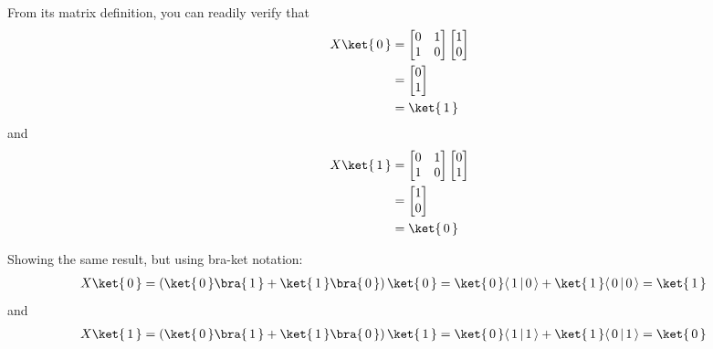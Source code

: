 \documentclass{article}
\theoremstyle{definition}
\newcommand{\kz}[1]{\ket{\,#1\,}}
\newcommand{\bz}[1]{\bra{\,#1\,}}
\begin{document}
From its matrix definition, you can readily verify that
\begin{align}
	X \kz0 &= \begin{bmatrix}
		0 & 1\\
		1 & 0
	\end{bmatrix} \begin{bmatrix}
		1\\
		0
	\end{bmatrix}\\
	&= \begin{bmatrix}
		0\\
		1
	\end{bmatrix}\\
	&= \kz1
\end{align}
and
\begin{align}
	X \kz1 &= \begin{bmatrix}
		0 & 1\\
		1 & 0
	\end{bmatrix} \begin{bmatrix}
		0\\
		1
	\end{bmatrix}\\
	&= \begin{bmatrix}
		1\\
		0
	\end{bmatrix}\\
	&= \kz0
\end{align}

Showing the same result, but using bra-ket notation:
\begin{align}
	X \kz0 &= \left(\kz{0}\bz{1} + \kz{1}\bz{0}\right) \kz0 = \kz{0} \langle \,1\,|\,0\,\rangle + \kz{1} \langle \,0\,|\,0\,\rangle = \kz{1}
\end{align}
and
\begin{align}
	X \kz1 &= \left(\kz{0}\bz{1} + \kz{1}\bz{0}\right) \kz1 = \kz{0} \langle \,1\,|\,1\,\rangle + \kz{1} \langle \,0\,|\,1\,\rangle = \kz{0}
\end{align}
\end{document}

